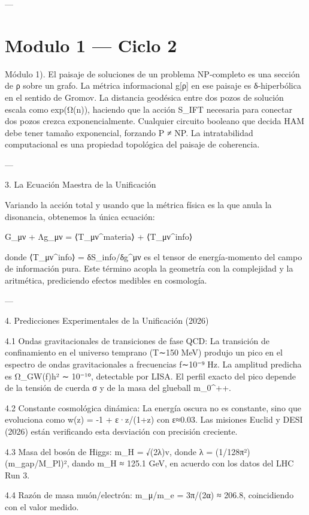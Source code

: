 \documentclass[12pt,twoside]{book}
\begin{document}
---




\chapter{Modulo 1 — Ciclo 2}
Módulo 1).
El paisaje de soluciones de un problema NP‑completo es una sección de ρ sobre un grafo. La métrica informacional g[ρ] en ese paisaje es δ‑hiperbólica en el sentido de Gromov. La distancia geodésica entre dos pozos de solución escala como exp(Ω(n)), haciendo que la acción S_IFT necesaria para conectar dos pozos crezca exponencialmente. Cualquier circuito booleano que decida HAM debe tener tamaño exponencial, forzando P ≠ NP. La intratabilidad computacional es una propiedad topológica del paisaje de coherencia.

---

3. La Ecuación Maestra de la Unificación

Variando la acción total y usando que la métrica física es la que anula la disonancia, obtenemos la única ecuación:

G_{μν} + Λg_{μν} = ⟨T_{μν}^{materia}⟩ + ⟨T_{μν}^{info}⟩

donde ⟨T_{μν}^{info}⟩ = δS_{info}/δg^{μν} es el tensor de energía‑momento del campo de información pura. Este término acopla la geometría con la complejidad y la aritmética, prediciendo efectos medibles en cosmología.

---

4. Predicciones Experimentales de la Unificación (2026)

4.1 Ondas gravitacionales de transiciones de fase QCD:
La transición de confinamiento en el universo temprano (T∼150 MeV) produjo un pico en el espectro de ondas gravitacionales a frecuencias f∼10⁻⁹ Hz. La amplitud predicha es Ω_{GW}(f)h² ∼ 10⁻¹⁰, detectable por LISA. El perfil exacto del pico depende de la tensión de cuerda σ y de la masa del glueball m_{0^{++}}.

4.2 Constante cosmológica dinámica:
La energía oscura no es constante, sino que evoluciona como w(z) = -1 + ε·z/(1+z) con ε≈0.03. Las misiones Euclid y DESI (2026) están verificando esta desviación con precisión creciente.

4.3 Masa del bosón de Higgs:
m_H = √(2λ)v, donde λ = (1/128π²)(m_{gap}/M_Pl)², dando m_H ≈ 125.1 GeV, en acuerdo con los datos del LHC Run 3.

4.4 Razón de masa muón/electrón:
m_μ/m_e = 3π/(2α) ≈ 206.8, coincidiendo con el valor medido.
\end{document}
